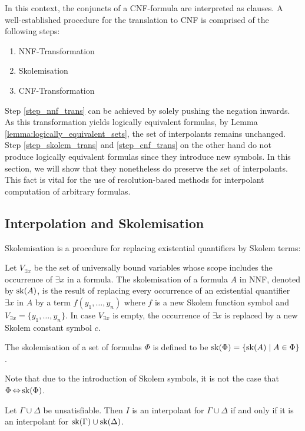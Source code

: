 In this context, the conjuncts of a CNF-formula are interpreted as clauses.
A well-established procedure for the translation to CNF is comprised of the following steps:

\begin{enumerate}
		\item NNF-Transformation \label{step_nnf_trans}
		\item Skolemisation \label{step_skolem_trans}
		\item CNF-Transformation \label{step_cnf_trans}
\end{enumerate}

Step \ref{step_nnf_trans} can be achieved by solely pushing the negation inwards.
As this transformation yields logically equivalent formulas, by Lemma \ref{lemma:logically_equivalent_sets}, the set of interpolants remains unchanged.
Step \ref{step_skolem_trans} and \ref{step_cnf_trans} on the other hand do not produce logically equivalent formulas since they introduce new symbols.
In this section, we will show that they nonetheless do preserve the set of interpolants.
This fact is vital for the use of resolution-based methods for interpolant computation of arbitrary formulas.


\subsection{Interpolation and Skolemisation}

Skolemisation is a procedure for replacing existential quantifiers by Skolem terms:

\begin{defi}
	Let $V_{\exists x}$ be the set of universally bound variables whose scope includes
	the occurrence of $\exists x$ in a formula.
	The skolemisation of a formula $A$ in NNF, denoted by $\operatorname{sk}(A)$, is the result of replacing every occurrence of an existential quantifier $\exists x$ in $A$ by a term $f(y_1, \ldots, y_n)$ where $f$ is a new Skolem function symbol and $V_{\exists x} = \{y_1, \ldots, y_n\}$.
	In case $V_{\exists x}$ is empty, the occurrence of $\exists x$ is replaced by a new Skolem constant symbol $c$.

	The skolemisation of a set of formulas $\Phi$ is defined to be $\operatorname{sk}(\Phi) = \{ \operatorname{sk}(A) \mid A \in \Phi \}$.
\end{defi}

Note that due to the introduction of Skolem symbols, it is not the case that $\Phi \operatorname{\Leftrightarrow} \operatorname{sk}(\Phi)$.

\begin{prop}
	Let $\Gamma \cup \Delta$ be unsatisfiable.
	Then $I$ is an interpolant for $\Gamma \cup \Delta$ if and only if it is an interpolant for $\operatorname{sk}(\Gamma) \cup \operatorname{sk}(\Delta)$. 
\end{prop}

